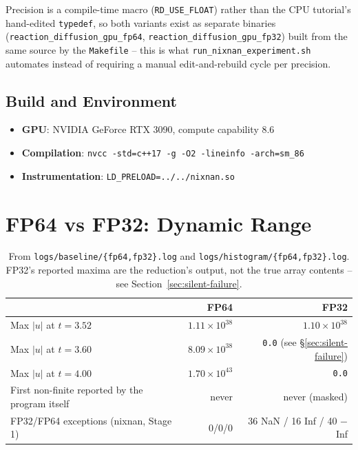 \documentclass[11pt,a4paper]{article}
\begin{document}
Precision is a compile-time macro (\texttt{RD\_USE\_FLOAT}) rather than the
CPU tutorial's hand-edited \texttt{typedef}, so both variants exist as
separate binaries (\texttt{reaction\_diffusion\_gpu\_fp64},
\texttt{reaction\_diffusion\_gpu\_fp32}) built from the same source by the
\texttt{Makefile} -- this is what \texttt{run\_nixnan\_experiment.sh}
automates instead of requiring a manual edit-and-rebuild cycle per
precision.

\subsection{Build and Environment}
\begin{itemize}
  \item \textbf{GPU}: NVIDIA GeForce RTX 3090, compute capability 8.6
  \item \textbf{Compilation}: \texttt{nvcc -std=c++17 -g -O2 -lineinfo -arch=sm\_86}
  \item \textbf{Instrumentation}: \texttt{LD\_PRELOAD=../../nixnan.so}
\end{itemize}

\section{FP64 vs FP32: Dynamic Range}
\label{sec:dynamic-range}

\begin{table}[ht]
\centering
\begin{tabular}{lrr}
\toprule
& FP64 & FP32 \\
\midrule
Max $|u|$ at $t=3.52$ & $1.11\times10^{38}$ & $1.10\times10^{38}$ \\
Max $|u|$ at $t=3.60$ & $8.09\times10^{38}$ & \texttt{0.0} (see \S\ref{sec:silent-failure}) \\
Max $|u|$ at $t=4.00$ & $1.70\times10^{43}$ & \texttt{0.0} \\
First non-finite reported by the program itself & never & never (masked) \\
FP32/FP64 exceptions (nixnan, Stage 1) & 0/0/0 & 36 NaN / 16 Inf / 40 $-$Inf \\
\bottomrule
\end{tabular}
\caption{From \texttt{logs/baseline/\{fp64,fp32\}.log} and
\texttt{logs/histogram/\{fp64,fp32\}.log}. FP32's reported maxima are the
reduction's output, not the true array contents -- see
Section~\ref{sec:silent-failure}.}
\label{tab:dynamic-range}
\end{table}
\end{document}
